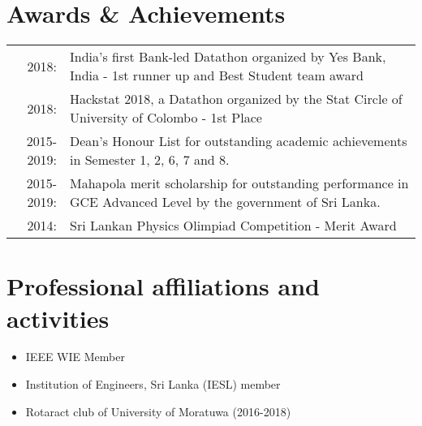 \documentclass[a4paper,11pt]{article}
\begin{document}
\section{Awards \& Achievements}
\begin{tabular}{rp{16cm}}
 2018:& {India's first Bank-led Datathon organized by Yes Bank, India - 1st runner up and Best Student team award}\\
2018:& {Hackstat 2018, a Datathon organized by the Stat Circle of University of Colombo - 1st Place}\\
2015-2019:&  {Dean's Honour List for outstanding academic achievements in Semester 1, 2, 6, 7 and 8.}\\2015-2019:&  {Mahapola merit scholarship for outstanding performance in GCE Advanced Level by the government} {of Sri Lanka.}
\\2014:& {Sri Lankan Physics Olimpiad Competition - Merit Award}\\
\end{tabular}

\bigskip


\section{Professional affiliations and activities}
\begin{itemize}
\setlength\itemsep{0.01em}
  \item IEEE WIE Member
  \item Institution of Engineers, Sri Lanka (IESL) member
  \item Rotaract club of University of Moratuwa (2016-2018)
\end{itemize}
\end{document}
